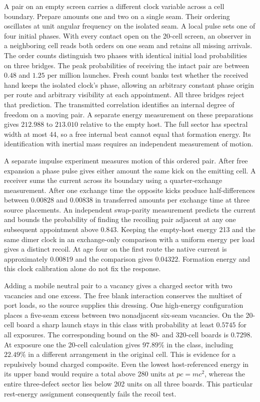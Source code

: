 \documentclass[11pt]{article}
\theoremstyle{definition}
\theoremstyle{remark}
\theoremstyle{plain}
\begin{document}
A pair on an empty screen carries a different clock variable across a
cell boundary. Prepare amounts one and two on a single seam. Their
ordering oscillates at unit angular frequency on the isolated seam.
A local pulse sets one of four initial phases. With every contact open
on the 20-cell screen, an observer in a neighboring cell reads both
orders on one seam and retains all missing arrivals. The order counts
distinguish two phases with identical initial load probabilities on
three bridges. The peak probabilities
of receiving the intact pair are between \(0.48\) and \(1.25\) per
million launches. Fresh count banks test whether the received hand
keeps the isolated clock's phase, allowing an arbitrary constant
phase origin per route and arbitrary visibility at each appointment.
All three bridges reject that prediction. The transmitted correlation
identifies an internal degree of freedom on a moving pair. A separate
energy measurement on these preparations gives \(212.988\) to
\(213.010\) relative to the empty host. The full sector has spectral
width at most 44, so a free internal beat cannot equal that formation
energy. Its identification with inertial mass requires an independent
measurement of motion.

A separate impulse experiment measures motion of this ordered pair.
After free expansion a phase pulse gives either amount the same kick on
the emitting cell. A receiver sums the current across its boundary
using a quarter-exchange measurement. After one exchange time the
opposite kicks produce half-differences between \(0.00828\) and
\(0.00838\) in transferred amounts per exchange time at three source
placements. An independent swap-parity measurement predicts the current
and bounds the probability of finding the recoiling pair adjacent at
any one subsequent appointment above \(0.843\). Keeping the empty-host
energy 213 and the same dimer clock in an exchange-only comparison with
a uniform energy per load gives a distinct recoil. At age four on the
first route the native current is approximately \(0.00819\) and the
comparison gives \(0.04322\). Formation energy and this clock
calibration alone do not fix the response.

Adding a mobile neutral pair to a vacancy gives a charged sector with
two vacancies and one excess. The free blank interaction conserves
the multiset of port loads, so the source supplies this dressing.
One high-energy configuration places a five-seam excess between two
nonadjacent six-seam vacancies. On the 20-cell board a sharp launch
stays in this class with probability at least $0.5745$ for all exposures.
The corresponding bound on the 80- and 320-cell boards is $0.7298$.
At exposure one the 20-cell calculation gives $97.89\%$ in the class,
including $22.49\%$ in a different arrangement in the original cell.
This is evidence for a repulsively bound charged composite.
Even the lowest host-referenced energy in its upper band would
require a total above 280 units at $pc=mc^2$, whereas the entire
three-defect sector lies below 202 units on all three boards. This
particular rest-energy assignment consequently fails the recoil test.
\end{document}
